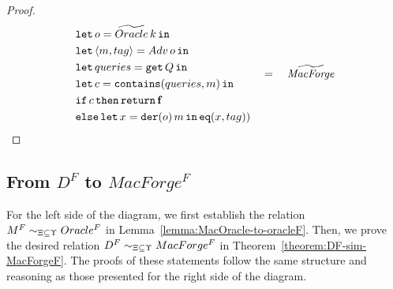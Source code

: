 \begin{proof}
{\begin{align*}
\begin{aligned}
        &\mathtt{let}\,o=\widetilde{Oracle}\,k\,\mathtt{in}\, \\
        &\mathtt{let}\,\langle m,tag \rangle = Adv\, o\,\mathtt{in}\, \\
        &\mathtt{let}\,queries = \mathtt{get}\, Q\,\mathtt{in}\, \\
        &\mathtt{let}\,c=\mathtt{contains}(queries, m)\,\mathtt{in}\, \\
        &\mathtt{if}\, c \,\mathtt{then}\, \mathtt{return}\, \mathbf{f} \\
        &\mathtt{else}\,\mathtt{let}\,x=\mathtt{der}(o)\, m\,\mathtt{in}\, \mathtt{eq}(x,tag))
    \end{aligned}
    \quad=\quad
    \mathit{\widetilde{MacForge}}
\end{align*}
}
\end{proof}

\subsection{From \texorpdfstring{$D^F$}{D} to \texorpdfstring{$MacForge^F$}{MacForge}}

For the left side of the diagram, we first establish the relation $M^F \sim_{\Xi\subseteq\Upsilon} Oracle^F$ in Lemma~\ref{lemma:MacOracle-to-oracleF}. Then, we prove the desired relation $D^F \sim_{\Xi\subseteq\Upsilon} MacForge^F$ in Theorem~\ref{theorem:DF-sim-MacForgeF}. The proofs of these statements follow the same structure and reasoning as those presented for the right side of the diagram.

